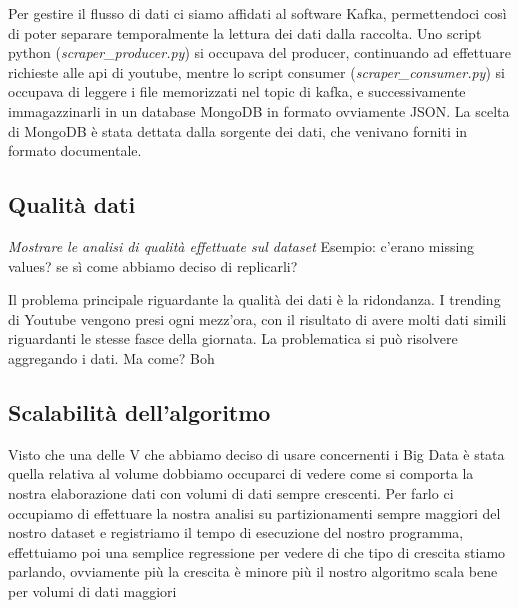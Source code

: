 \documentclass[10pt, a4paper,openany]{article}
\begin{document}
Per gestire il flusso di dati ci siamo affidati al software Kafka, permettendoci così di poter separare temporalmente la lettura dei dati dalla raccolta. Uno script python (\textit{scraper\_producer.py}) si occupava del producer, continuando ad effettuare richieste alle api di youtube, mentre lo script consumer (\textit{scraper\_consumer.py}) si occupava di leggere i file memorizzati nel topic di kafka, e successivamente immagazzinarli in un database MongoDB in formato ovviamente JSON. La scelta di MongoDB è stata dettata dalla sorgente dei dati, che venivano forniti in formato documentale.
 

\subsection*{Qualità dati}
\textit{Mostrare le analisi di qualità effettuate sul dataset} Esempio: c'erano missing values? se sì come abbiamo deciso di replicarli?
 
Il problema principale riguardante la qualità dei dati è la ridondanza. I trending di Youtube vengono presi ogni mezz'ora, con il risultato di avere molti dati simili riguardanti le stesse fasce della giornata. La problematica si può risolvere aggregando i dati. Ma come? Boh

\subsection*{Scalabilità dell'algoritmo}

Visto che una delle V che abbiamo deciso di usare concernenti i Big Data è stata quella relativa al volume dobbiamo occuparci di vedere come si comporta la nostra elaborazione dati con volumi di dati sempre crescenti. Per farlo ci occupiamo di effettuare la nostra analisi su partizionamenti sempre maggiori del nostro dataset e registriamo il tempo di esecuzione del nostro programma, effettuiamo poi una semplice regressione per vedere di che tipo di crescita stiamo parlando, ovviamente più la crescita è minore più il nostro algoritmo scala bene per volumi di dati maggiori
\end{document}
